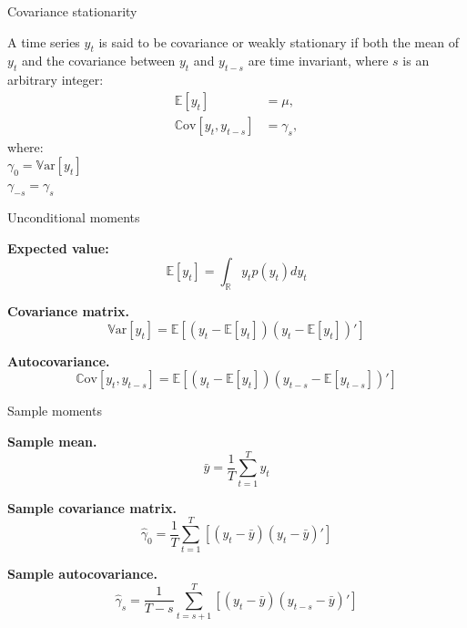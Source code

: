 \documentclass[notes,blackandwhite,mathsans]{beamer}
\begin{document}
\begin{frame}{Covariance stationarity}


\vspace{0.3cm}
{\color{mcxs2}A time series} ${y_t}$ {\color{mcxs2}is said to be} {\color{mcxs2}covariance or weakly stationary} {\color{mcxs2}if both the} mean {\color{mcxs2}of} $y_t$ {\color{mcxs2}and the} covariance {\color{mcxs2}between} $y_t$ and $y_{t-s}$ {\color{mcxs2}are} {\color{mcxs2}time invariant}, {\color{mcxs2}where} $s$ {\color{mcxs2}is an arbitrary integer:}
\begin{align*}
\mathbb{E}[y_t] &= \mu, \\
\mathbb{C}\text{ov}[y_t, y_{t-s}] &= \gamma_s,
\end{align*}
{\color{mcxs2}where:}\\
\hspace{0.3cm}$\gamma_0 = \mathbb{V}\text{ar}[y_t]$\\
\hspace{0.3cm}$ \gamma_{-s} = \gamma_s $

\end{frame}




\begin{frame}{Unconditional moments}


\textbf{Expected value:}
$$ \mathbb{E}[y_{t}] = \int_{\mathbb{R}}y_tp(y_t)dy_t $$


\textbf{Covariance matrix.}
$$ \mathbb{V}\text{ar}[y_{t}] = \mathbb{E}\left[\left(y_{t} - \mathbb{E}[y_{t}]\right)\left(y_{t} - \mathbb{E}[y_{t}]\right)'\right] $$


\textbf{Autocovariance.}
$$ \mathbb{C}\text{ov}[y_{t}, y_{t-s}] = \mathbb{E}\left[\left(y_{t} - \mathbb{E}[y_{t}]\right)\left(y_{t-s} - \mathbb{E}[y_{t-s}]\right)'\right] $$

\end{frame}





\begin{frame}{Sample moments}

\textbf{Sample mean.}
$$ \bar{y} = \frac{1}{T}\sum_{t=1}^{T}y_t $$


\textbf{Sample covariance matrix.}\\
$$ \hat{\gamma}_0 = \frac{1}{T}\sum_{t=1}^{T}\left[(y_{t} - \bar{y})(y_{t} - \bar{y})'\right] $$


\textbf{Sample autocovariance.}
$$ \hat{\gamma}_s = \frac{1}{T-s}\sum_{t=s+1}^{T}\left[(y_{t} - \bar{y})(y_{t-s} - \bar{y})'\right] $$

\end{frame}
\end{document}

